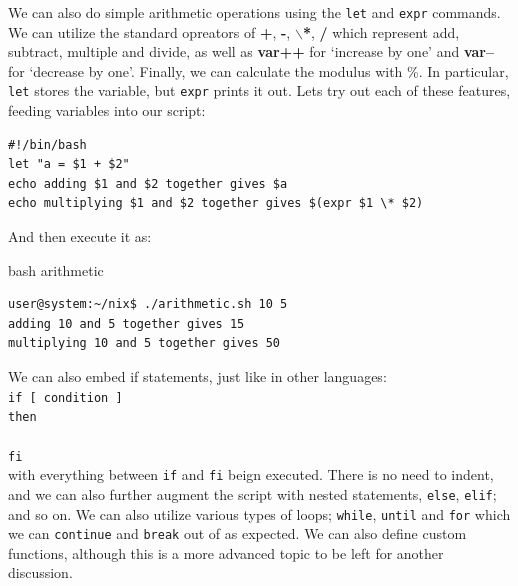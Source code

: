 \documentclass[11pt]{article}
\begin{document}
We can also do simple arithmetic operations using the \texttt{let} and \texttt{expr} commands. We can utilize the standard opreators of \textbf{+}, \textbf{-}, \textbf{$\backslash$*},\textbf{ /} which represent add, subtract, multiple and divide, as well as \textbf{var++} for `increase by one' and \textbf{var--} for `decrease by one'. Finally, we can calculate the modulus with \%. In particular, \texttt{let} stores the variable, but \texttt{expr} prints it out. Lets try out each of these features, feeding variables into our script: \\

\begin{listing}[H]
\begin{verbatim}
#!/bin/bash
let "a = $1 + $2"
echo adding $1 and $2 together gives $a
echo multiplying $1 and $2 together gives $(expr $1 \* $2)
\end{verbatim}
\end{listing}

\noindent
And then execute it as:\\

\begin{listing}[H]
\caption{bash arithmetic}\vspace{-0.1in}
\begin{verbatim}
user@system:~/nix$ ./arithmetic.sh 10 5
adding 10 and 5 together gives 15
multiplying 10 and 5 together gives 50
\end{verbatim}
\end{listing}
\noindent
We can also embed if statements, just like in other languages:\\

\noindent
\texttt{if [ condition ]\\
then\\
\\
fi}\\

\noindent with everything between \texttt{if} and \texttt{fi} beign executed. There is no need to indent, and we can also further augment the script with nested statements, \texttt{else}, \texttt{elif}; and so on. We can also utilize various types of loops; \texttt{while}, \texttt{until} and \texttt{for} which we can \texttt{continue} and \texttt{break} out of as expected. We can also define custom functions, although this is a more advanced topic to be left for another discussion.
\end{document}
